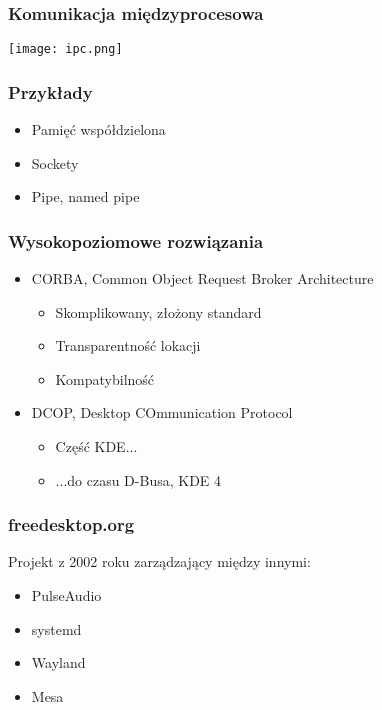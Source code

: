 \begin{frame}
\frametitle{Komunikacja międzyprocesowa}
\texttt{[image: ipc.png]}
\end{frame}

\begin{frame}
    \frametitle{Przykłady}
        \begin{itemize}
        \item Pamięć współdzielona
        \item Sockety
        \item Pipe, named pipe
    \end{itemize}
\end{frame}

\begin{frame}
    \frametitle{Wysokopoziomowe rozwiązania}
    \begin{itemize}
        \item CORBA, Common Object Request Broker Architecture
        \begin{itemize}
            \item Skomplikowany, złożony standard
            \item Transparentność lokacji
            \item Kompatybilność
        \end{itemize}
        \item DCOP, Desktop COmmunication Protocol
        \begin{itemize}
            \item Część KDE...
            \item ...do czasu D-Busa, KDE 4
        \end{itemize}
    \end{itemize}

\end{frame}


\begin{frame}
    \frametitle{freedesktop.org}
    Projekt z 2002 roku zarządzający między innymi:
    \begin{itemize}
        \item PulseAudio
        \item systemd
        \item Wayland
        \item Mesa
    \end{itemize}

\end{frame}
    


